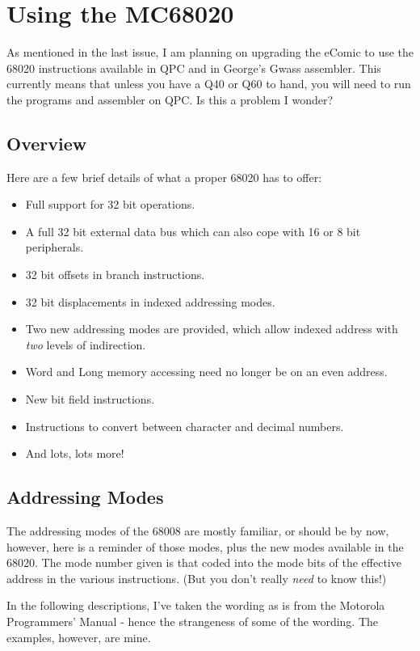 \chapter{Using the MC68020}
As mentioned in the last issue, I am planning on upgrading the eComic to use the 68020 instructions available in QPC and in George's Gwass assembler. This currently means that unless you have a Q40 or Q60 to hand, you will need to run the programs and assembler on QPC. Is this a problem I wonder?

\section{Overview}
Here are a few brief details of what a proper 68020 has to offer:

\begin{itemize}
\item Full support for 32 bit operations.
\item A full 32 bit external data bus which can also cope with 16 or 8 bit peripherals.
\item 32 bit offsets in branch instructions.
\item 32 bit displacements in indexed addressing modes.
\item Two new addressing modes are provided, which allow indexed address with \emph{two} levels of indirection. 
\item Word and Long memory accessing need no longer be on an even address.
\item New bit field instructions.
\item Instructions to convert between character and decimal numbers.
\item And lots, lots more!
\end{itemize}


\section{Addressing Modes}
The addressing modes of the 68008 are mostly familiar, or should be by now, however, here is a reminder of those modes, plus the new modes available in the 68020. The mode number given is that coded into the mode bits of the effective address in the various instructions. (But you don't really \emph{need} to know this!) 

In the following descriptions, I've taken the wording as is from the Motorola Programmers' Manual - hence the strangeness of some of the wording. The examples, however, are mine.

